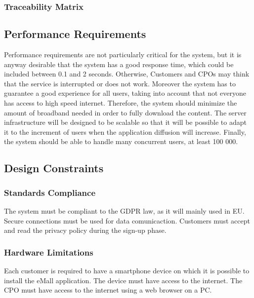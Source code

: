 \subsubsection{Traceability Matrix}
\subsection{Performance Requirements}

Performance requirements are not particularly critical for the system, but it is anyway desirable that the system has a good response time, which could be included between 0.1 and 2 seconds.
Otherwise, Customers and CPOs may think that the service is interrupted or does not work.
Moreover the system has to guarantee a good experience for all users, taking into account that not everyone has access to high speed internet. Therefore,
the system should minimize the amount of broadband needed in order to fully
download the content.
The server infrastructure will be designed to be scalable so that it will be possible to adapt it to
the increment of users when the application diffusion will increase.
Finally, the system should be able to handle many concurrent users, at least
100 000.
\subsection{Design Constraints}
\subsubsection{Standards Compliance}

The system must be compliant to the GDPR law, as it will mainly used in EU. \newline
Secure connections must be used for data comunicaction. \newline
Customers must accept and read the privacy policy during the sign-up phase. \newline

\subsubsection{Hardware Limitations}

Each customer is required to have a smartphone device on which it is possible to install the eMall application. The device must have access to the internet. \newline
The CPO must have access to the internet using a web browser on a PC.  

